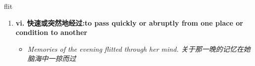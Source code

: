 
\begin{frame}
{\huge flit}
\begin{center}
\begin{enumerate}\Large
  \item \textbf{vi. 快速或突然地经过:to pass quickly or abruptly from one place or condition to another}
  \begin{itemize}
    \item \em{\Large{Memories of the evening flitted through her mind. 关于那一晚的记忆在她脑海中一掠而过}}
  \end{itemize}
\end{enumerate}
\end{center}
\end{frame}
